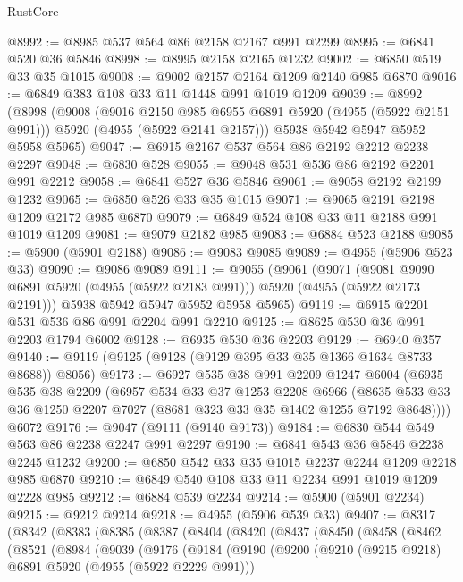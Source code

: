 \begin{lexlean}{RustCore}
\begin{coremodule}
@8992 := @8985 @537 @564 @86 @2158 @2167 @991 @2299
@8995 := @6841 @520 @36 @5846
@8998 := @8995 @2158 @2165 @1232
@9002 := @6850 @519 @33 @35 @1015
@9008 := @9002 @2157 @2164 @1209 @2140 @985 @6870
@9016 := @6849 @383 @108 @33 @11 @1448 @991 @1019 @1209
@9039 := @8992
    (@8998
      (@9008
        (@9016 @2150 @985 @6955 @6891 @5920 (@4955 (@5922 @2151 @991)))
        @5920
        (@4955 (@5922 @2141 @2157)))
      @5938
      @5942
      @5947
      @5952
      @5958
      @5965)
@9047 := @6915 @2167 @537 @564 @86 @2192 @2212 @2238 @2297
@9048 := @6830 @528
@9055 := @9048 @531 @536 @86 @2192 @2201 @991 @2212
@9058 := @6841 @527 @36 @5846
@9061 := @9058 @2192 @2199 @1232
@9065 := @6850 @526 @33 @35 @1015
@9071 := @9065 @2191 @2198 @1209 @2172 @985 @6870
@9079 := @6849 @524 @108 @33 @11 @2188 @991 @1019 @1209
@9081 := @9079 @2182 @985
@9083 := @6884 @523 @2188
@9085 := @5900 (@5901 @2188)
@9086 := @9083 @9085
@9089 := @4955 (@5906 @523 @33)
@9090 := @9086 @9089
@9111 := @9055
    (@9061
      (@9071 (@9081 @9090 @6891 @5920 (@4955 (@5922 @2183 @991))) @5920 (@4955 (@5922 @2173 @2191)))
      @5938
      @5942
      @5947
      @5952
      @5958
      @5965)
@9119 := @6915 @2201 @531 @536 @86 @991 @2204 @991 @2210
@9125 := @8625 @530 @36 @991 @2203 @1794 @6002
@9128 := @6935 @530 @36 @2203
@9129 := @6940 @357
@9140 := @9119 (@9125 (@9128 (@9129 @395 @33 @35 @1366 @1634 @8733 @8688)) @8056)
@9173 := @6927
    @535
    @38
    @991
    @2209
    @1247
    @6004
    (@6935
      @535
      @38
      @2209
      (@6957
        @534
        @33
        @37
        @1253
        @2208
        @6966
        (@8635 @533 @33 @36 @1250 @2207 @7027 (@8681 @323 @33 @35 @1402 @1255 @7192 @8648))))
    @6072
@9176 := @9047 (@9111 (@9140 @9173))
@9184 := @6830 @544 @549 @563 @86 @2238 @2247 @991 @2297
@9190 := @6841 @543 @36 @5846 @2238 @2245 @1232
@9200 := @6850 @542 @33 @35 @1015 @2237 @2244 @1209 @2218 @985 @6870
@9210 := @6849 @540 @108 @33 @11 @2234 @991 @1019 @1209 @2228 @985
@9212 := @6884 @539 @2234
@9214 := @5900 (@5901 @2234)
@9215 := @9212 @9214
@9218 := @4955 (@5906 @539 @33)
@9407 := @8317
    (@8342
      (@8383
        (@8385
          (@8387
            (@8404
              (@8420
                (@8437
                  (@8450
                    (@8458
                      (@8462
                        (@8521
                          (@8984
                            (@9039
                              (@9176
                                (@9184
                                  (@9190
                                    (@9200
                                      (@9210 (@9215 @9218) @6891 @5920 (@4955 (@5922 @2229 @991)))

\end{coremodule}
\end{lexlean}
